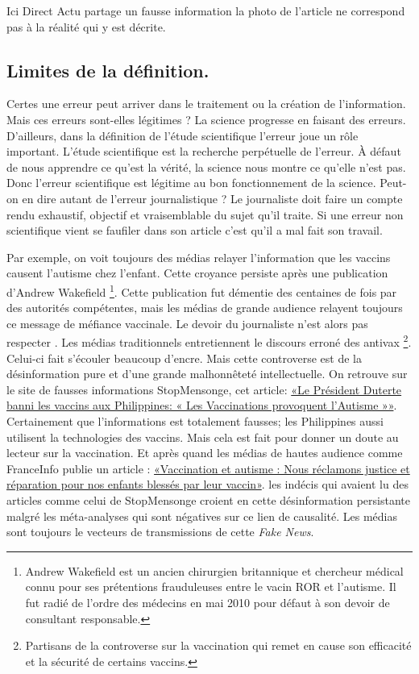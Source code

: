\documentclass[11pt,a4paper,oldfontcommands]{memoir}
\begin{document}
Ici Direct Actu partage un fausse information la photo de l'article ne correspond pas à la réalité qui y est décrite.

\subsection{Limites de la définition.}
Certes une erreur peut arriver dans le traitement ou la création de l'information.
Mais ces erreurs sont-elles légitimes ?
La science progresse en faisant des erreurs.
D'ailleurs, dans la définition de l'étude scientifique l'erreur joue un rôle important.
L'étude scientifique est la recherche perpétuelle de l'erreur.
À défaut de nous apprendre ce qu'est la vérité, la science nous montre ce qu'elle n'est pas.
Donc l'erreur scientifique est légitime au bon fonctionnement de la science.
Peut-on en dire autant de l'erreur journalistique ?
Le journaliste doit faire un compte rendu exhaustif, objectif et vraisemblable du sujet qu'il traite.
Si une erreur non scientifique vient se faufiler dans son article c'est qu'il a mal fait son travail.

Par exemple, on voit toujours des médias relayer l'information que les vaccins causent l'autisme chez l'enfant.
Cette croyance persiste après une publication d'Andrew Wakefield
\footnote{Andrew Wakefield est un ancien chirurgien britannique et chercheur médical connu pour ses prétentions frauduleuses entre le vacin ROR et l'autisme.
 Il fut radié de l'ordre des médecins en mai 2010 pour défaut à son devoir de consultant responsable.}.
Cette publication fut démentie des centaines de fois par des autorités compétentes, mais les médias de grande audience relayent toujours ce message de méfiance vaccinale.
Le devoir du journaliste n'est alors pas respecter .
Les médias traditionnels entretiennent le discours erroné des antivax
\footnote{Partisans de la controverse sur la vaccination qui remet en cause son efficacité et la sécurité de certains vaccins.}.
Celui-ci fait s'écouler beaucoup d'encre.
Mais cette controverse est de la désinformation pure et d'une grande malhonnêteté intellectuelle. On retrouve sur le site de fausses informations StopMensonge, cet article: \href{https://stopmensonges.com/le-president-duterte-banni-les-vaccins-aux-philippines-les-vaccinations-provoquent-lautisme/}{«Le Président Duterte banni les vaccins aux Philippines: « Les Vaccinations provoquent l’Autisme »»}.
Certainement que l'informations est totalement fausses;  les Philippines aussi utilisent la technologies des vaccins.
Mais cela est fait pour donner un doute au lecteur sur la vaccination.
Et après quand les médias de hautes audience comme FranceInfo publie un article :
\href{https://www.francetvinfo.fr/sante/vaccins/vaccination-et-autisme-nous-reclamons-justice-et-reparation-pour-nos-enfants-blesses-par-leur-vaccin_2297901.html}{«Vaccination et autisme : Nous réclamons justice et réparation pour nos enfants blessés par leur vaccin»}. les indécis qui avaient lu des articles comme celui de StopMensonge croient en cette désinformation persistante malgré les méta-analyses qui sont négatives sur ce lien de causalité.
Les médias sont toujours le vecteurs de transmissions de cette \textit{Fake News}.
\end{document}
